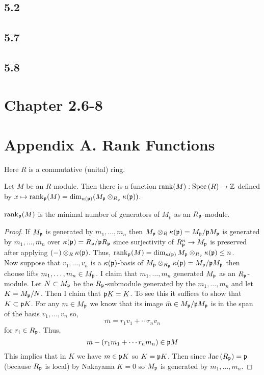\documentclass[12pt]{article}
\begin{document}
\subsection{5.2}

\subsection{5.7}

\subsection{5.8}

\section{Chapter 2.6-8}

\section{Appendix A. Rank Functions}

\begin{remark}
Here $R$ is a commutative (unital) ring. 
\end{remark}

\begin{definition}
Let $M$ be an $R$-module. Then there is a function $\mathrm{rank}(M) : \mathrm{Spec}\left( R \right) \to \mathbb{Z}$ defined by $x \mapsto \mathrm{rank}_{\mathfrak{p}}(M) = \dim_{\kappa(\mathfrak{p})}(M_{\mathfrak{p}} \otimes_{R_{\mathfrak{p}}} \kappa(\mathfrak{p}))$. 
\end{definition}

\begin{proposition}
$\mathrm{rank}_{\mathfrak{p}}(M)$ is the minimal number of generators of $M_p$ as an $R_{\mathfrak{p}}$-module.
\end{proposition}

\begin{proof}
If $M_{\mathfrak{p}}$ is generated by $m_1, \dots, m_n$ then $M_{\mathfrak{p}} \otimes_R \kappa(\mathfrak{p}) = M_{\mathfrak{p}} / \mathfrak{p} M_{\mathfrak{p}}$ is generated by $\bar{m}_1, \dots, \bar{m}_n$ over $\kappa(\mathfrak{p}) = R_{\mathfrak{p}} / \mathfrak{p} R_{\mathfrak{p}}$ since surjectivity of $R_{\mathfrak{p}}^n \to M_{\mathfrak{p}}$ is preserved after applying $(-) \otimes_R \kappa(\mathfrak{p})$. Thus, $\mathrm{rank}_{\mathfrak{p}}(M) = \dim_{\kappa(\mathfrak{p})} M_{\mathfrak{p}} \otimes_{R_{\mathfrak{p}}} \kappa(\mathfrak{p}) \le n$. 
\bigskip\\
Now suppose that $v_1, \dots, v_n$ is a $\kappa(\mathfrak{p})$-basis of $M_{\mathfrak{p}} \otimes_{R_{\mathfrak{p}}} \kappa(\mathfrak{p}) = M_{\mathfrak{p}} / \mathfrak{p} M_{\mathfrak{p}}$ then choose lifts $m_1, \dots, m_n \in M_{\mathfrak{p}}$. I claim that $m_1, \dots, m_n$ generated $M_{\mathfrak{p}}$ as an $R_{\mathfrak{p}}$-module. Let $N \subset M_{\mathfrak{p}}$ be the $R_{\mathfrak{p}}$-submodule generated by the $m_1, \dots, m_n$ and let $K = M_{\mathfrak{p}} / N$. Then I claim that $\mathfrak{p} K = K$. To see this it suffices to show that $K \subset \mathfrak{p} K$. For any $m \in M_{\mathfrak{p}}$ we know that its image $\bar{m} \in M_{\mathfrak{p}} / \mathfrak{p} M_{\mathfrak{p}}$ is in the span of the basis $v_1, \dots, v_n$ so,
\[ \bar{m} = r_1 v_1 + \cdots r_n v_n \]
for $r_i \in R_{\mathfrak{p}}$. Thus,
\[ m - (r_1 m_1 + \cdots r_n m_n) \in \mathfrak{p} M \]
This implies that in $K$ we have $m \in \mathfrak{p} K$ so $K = \mathfrak{p} K$. Then since $\mathrm{Jac}\left( R_{\mathfrak{p}} \right) = \mathfrak{p}$ (because $R_{\mathfrak{p}}$ is local) by Nakayama $K = 0$ so $M_{\mathfrak{p}}$ is generated by $m_1, \dots, m_n$. 
\end{proof}
\end{document}
